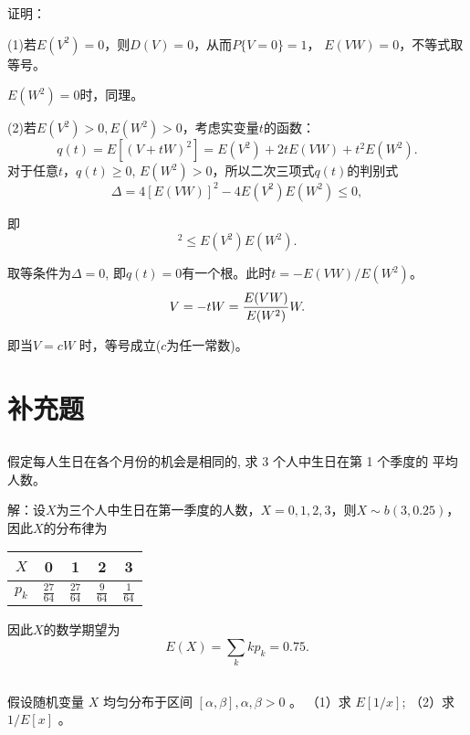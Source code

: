 \documentclass[UTF8,a4paper,10pt]{ctexart}
\begin{document}
证明：

(1)若$E(V^2)=0$，则$D(V)=0$，从而$P\{V=0\}=1$， $E(VW)=0$，不等式取等号。

$E(W^2)=0$时，同理。

(2)若$E(V^2)>0, E(W^2)>0$，考虑实变量$t$的函数：
\begin{equation}
    q(t)=E[(V+tW)^2] = E(V^2) +2tE(VW)+t^2E(W^2).
\end{equation}
对于任意$t$，$q(t)\geq0$, $E(W^2)>0$，所以二次三项式$q(t)$的判别式
\begin{equation}
    \Delta = 4[E(VW)]^2-4E(V^2)E(W^2)\leq0,
\end{equation}

即
\begin{equation}
    [E(VW)]^2 \leq E(V^2) E(W^2).
\end{equation}

取等条件为$\Delta=0$, 即$q(t)=0$有一个根。此时$t= -E(VW)/E(W^2)$。
\begin{equation}
    V = -t W =  {E(VW)\over E(W^2)} W.
\end{equation}

即当$V=c W$ 时，等号成立($c$为任一常数)。
\newpage
\section{补充题}
\subsection{}
假定每人生日在各个月份的机会是相同的, 求 3 个人中生日在第 1 个季度的 平均人数。

解：设$X$为三个人中生日在第一季度的人数，$X = 0, 1, 2, 3$，则$X\sim b(3, 0.25)$，因此$X$的分布律为
\begin{center}
    \begin{tabular}{c|cccc}
        $X$ & 0 & 1 & 2 & 3 \\
        \hline
        $p_k$ & $\frac{27}{64}$ & $\frac{27}{64}$ & $\frac{9}{64}$ & $\frac{1}{64}$
    \end{tabular}
\end{center}

因此$X$的数学期望为
\begin{equation}
    E(X) = \sum_{k}kp_k = 0.75.
\end{equation}

\subsection{}
假设随机变量 $X$ 均匀分布于区间 $[\alpha, \beta], \alpha, \beta>0$ 。
（1）求 $E[1 / x]$;
（2）求 $1 / E[x]$ 。
\end{document}
